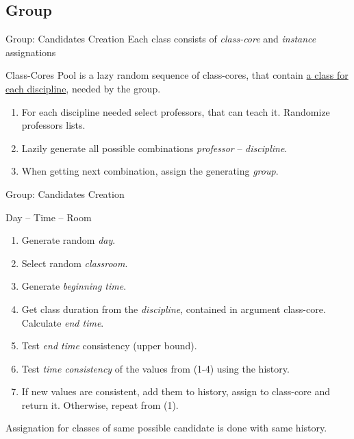 \subsection{Group}




\begin{frame}{Group: Candidates Creation}
  \centering
  Each class consists of \emph{class-core} and \emph{instance} assignations

  \bigskip \bigskip

  \begin{block}{Class-Cores Pool}
    is a lazy random sequence of class-cores,
    that contain \underline{a class for each discipline}, needed by the group.

    \medskip

    \begin{enumerate}
      \item For each discipline needed select professors, that can teach it.
            Randomize professors lists.
      \item Lazily generate all possible combinations \emph{professor} -- \emph{discipline}.
      \item When getting next combination, assign the generating \emph{group}.
    \end{enumerate}
  \end{block}
\end{frame}

\begin{frame}{Group: Candidates Creation}
  \begin{block}{Day -- Time -- Room}
    \begin{enumerate}
      \item Generate random \emph{day}.
      \item Select random \emph{classroom}.
      \item Generate \emph{beginning time}.
      \item Get class duration from the \emph{discipline}, contained in argument class-core.
            Calculate \emph{end time}.
      \item Test \emph{end time} consistency (upper bound).
      \item Test \emph{time consistency} of the values from (1-4) using the history.
      \item If new values are consistent, add them to history, assign to class-core
            and return it.
            Otherwise, repeat from (1).
    \end{enumerate}
    Assignation for classes of same possible candidate is done with same
      history.
  \end{block}
\end{frame}


